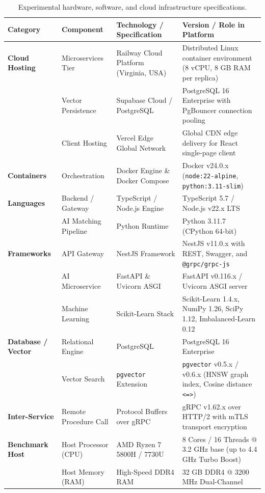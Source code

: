 \documentclass[a4paper,fleqn]{cas-dc}
\begin{document}
\begin{table}[t]
\caption{Experimental hardware, software, and cloud infrastructure specifications.}
\label{tbl:infrastructure}
\centering
\small
\begin{tabular*}{\textwidth}{@{\extracolsep{\fill}}lp{3.5cm}p{4cm}p{5.5cm}@{}}
\toprule
\textbf{Category} & \textbf{Component} & \textbf{Technology / Specification} & \textbf{Version / Role in Platform} \\
\midrule
\textbf{Cloud Hosting} & Microservices Tier & Railway Cloud Platform (Virginia, USA) & Distributed Linux container environment (8 vCPU, 8 GB RAM per replica) \\
 & Vector Persistence & Supabase Cloud / PostgreSQL & PostgreSQL 16 Enterprise with PgBouncer connection pooling \\
 & Client Hosting & Vercel Edge Global Network & Global CDN edge delivery for React single-page client \\
\textbf{Containers} & Orchestration & Docker Engine \& Docker Compose & Docker v24.0.x (\texttt{node:22-alpine}, \texttt{python:3.11-slim}) \\
\textbf{Languages} & Backend / Gateway & TypeScript / Node.js Engine & TypeScript 5.7 / Node.js v22.x LTS \\
 & AI Matching Pipeline & Python Runtime & Python 3.11.7 (CPython 64-bit) \\
\textbf{Frameworks} & API Gateway & NestJS Framework & NestJS v11.0.x with REST, Swagger, and \texttt{@grpc/grpc-js} \\
 & AI Microservice & FastAPI \& Uvicorn ASGI & FastAPI v0.116.x / Uvicorn ASGI server \\
 & Machine Learning & Scikit-Learn Stack & Scikit-Learn 1.4.x, NumPy 1.26, SciPy 1.12, Imbalanced-Learn 0.12 \\
\textbf{Database / Vector} & Relational Engine & PostgreSQL & PostgreSQL 16 Enterprise \\
 & Vector Search & \texttt{pgvector} Extension & \texttt{pgvector} v0.5.x / v0.6.x (HNSW graph index, Cosine distance \texttt{<=>}) \\
\textbf{Inter-Service} & Remote Procedure Call & Protocol Buffers over gRPC & gRPC v1.62.x over HTTP/2 with mTLS transport encryption \\
\textbf{Benchmark Host} & Host Processor (CPU) & AMD Ryzen 7 5800H / 7730U & 8 Cores / 16 Threads @ 3.2 GHz base (up to 4.4 GHz Turbo Boost) \\
 & Host Memory (RAM) & High-Speed DDR4 RAM & 32 GB DDR4 @ 3200 MHz Dual-Channel \\
\bottomrule
\end{tabular*}
\end{table}
\end{document}
